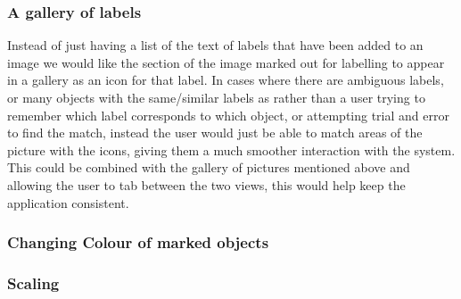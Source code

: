 \documentclass[a4paper,11pt,oneside]{article}
\begin{document}
\subsubsection{A gallery of labels}
Instead of just having a list of the text of labels that have been added to an
image we would like the section of the image marked out for labelling to appear
in a gallery as an icon for that label.  In cases where there are ambiguous
labels, or many objects with the same/similar labels as rather than a user
trying to remember which label corresponds to which object, or attempting trial
and error to find the match, instead the user would just be able to match areas
of the picture with the icons, giving them a much smoother interaction with the
system.  This could be combined with the gallery of pictures mentioned above and
allowing the user to tab between the two views, this would help keep the
application consistent.
\subsubsection{Changing Colour of marked objects}
\subsubsection{Scaling}
\end{document}
